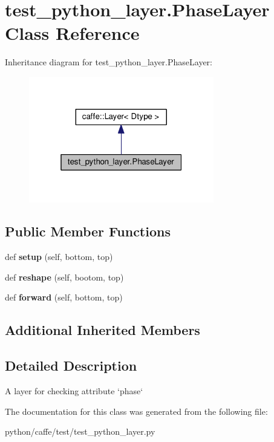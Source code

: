 \hypertarget{classtest__python__layer_1_1_phase_layer}{}\section{test\+\_\+python\+\_\+layer.\+Phase\+Layer Class Reference}
\label{classtest__python__layer_1_1_phase_layer}


Inheritance diagram for test\+\_\+python\+\_\+layer.\+Phase\+Layer\+:
\nopagebreak
\begin{figure}[H]
\begin{center}
\leavevmode
\includegraphics[width=229pt]{classtest__python__layer_1_1_phase_layer__inherit__graph}
\end{center}
\end{figure}
\subsection*{Public Member Functions}
\begin{DoxyCompactItemize}
\item 
\mbox{\label{classtest__python__layer_1_1_phase_layer_a7810a356618f20c30899da1634e3a88d}} 
def {\bfseries setup} (self, bottom, top)
\item 
\mbox{\label{classtest__python__layer_1_1_phase_layer_a3c434bcc42a54eecb00ad1a262412827}} 
def {\bfseries reshape} (self, bootom, top)
\item 
\mbox{\label{classtest__python__layer_1_1_phase_layer_a960b6f3200e52806a0f1700a32410748}} 
def {\bfseries forward} (self, bottom, top)
\end{DoxyCompactItemize}
\subsection*{Additional Inherited Members}


\subsection{Detailed Description}
\begin{DoxyVerb}A layer for checking attribute `phase`\end{DoxyVerb}
 

The documentation for this class was generated from the following file\+:\begin{DoxyCompactItemize}
\item 
python/caffe/test/test\+\_\+python\+\_\+layer.\+py\end{DoxyCompactItemize}
